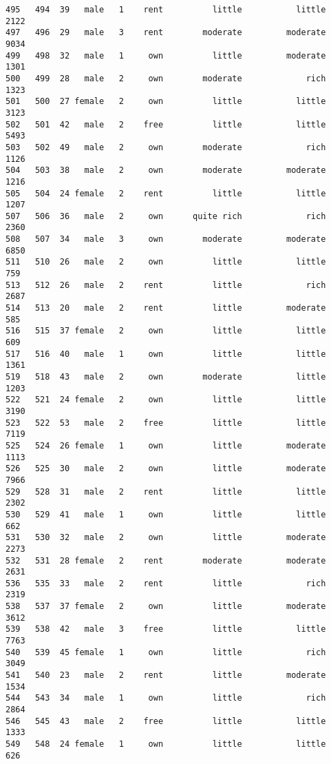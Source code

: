 \documentclass[
]{article}
\begin{document}
\begin{verbatim}
495   494  39   male   1    rent          little           little          2122
497   496  29   male   3    rent        moderate         moderate          9034
499   498  32   male   1     own          little         moderate          1301
500   499  28   male   2     own        moderate             rich          1323
501   500  27 female   2     own          little           little          3123
502   501  42   male   2    free          little           little          5493
503   502  49   male   2     own        moderate             rich          1126
504   503  38   male   2     own        moderate         moderate          1216
505   504  24 female   2    rent          little           little          1207
507   506  36   male   2     own      quite rich             rich          2360
508   507  34   male   3     own        moderate         moderate          6850
511   510  26   male   2     own          little           little           759
513   512  26   male   2    rent          little             rich          2687
514   513  20   male   2    rent          little         moderate           585
516   515  37 female   2     own          little           little           609
517   516  40   male   1     own          little           little          1361
519   518  43   male   2     own        moderate           little          1203
522   521  24 female   2     own          little           little          3190
523   522  53   male   2    free          little           little          7119
525   524  26 female   1     own          little         moderate          1113
526   525  30   male   2     own          little         moderate          7966
529   528  31   male   2    rent          little           little          2302
530   529  41   male   1     own          little           little           662
531   530  32   male   2     own          little         moderate          2273
532   531  28 female   2    rent        moderate         moderate          2631
536   535  33   male   2    rent          little             rich          2319
538   537  37 female   2     own          little         moderate          3612
539   538  42   male   3    free          little           little          7763
540   539  45 female   1     own          little             rich          3049
541   540  23   male   2    rent          little         moderate          1534
544   543  34   male   1     own          little             rich          2864
546   545  43   male   2    free          little           little          1333
549   548  24 female   1     own          little           little           626

\end{verbatim}
\end{document}
